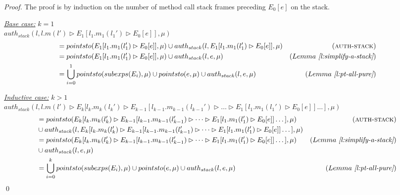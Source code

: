 \documentclass{llncs}
\begin{document}
\begin{proof} The proof is by induction on the number of method call stack frames preceding $E_0[e]$ on the stack.

\noindent\underline{\textit{Base case:}} $k = 1$\\
\noindent$auth_{stack}(l, l.m(l') \rhd E_1[l_1.m_1(l_1') \rhd E_0[e]], \mu)$
\vspace{-7pt}
\begin{align*}
&= pointsto(E_1[l_1.m_1(l_1') \rhd E_0[e]], \mu) \cup auth_{stack}(l, E_1[l_1.m_1(l_1') \rhd E_0[e]], \mu) & (\textsc{auth-stack}) \\
&= pointsto(E_1[l_1.m_1(l_1') \rhd E_0[e]], \mu) \cup auth_{stack}(l, e, \mu) & (Lemma~\textit{\ref{l:simplify-a-stack}}) \\
&= \bigcup^1_{i = 0} pointsto(subexps(E_i), \mu) \cup pointsto(e, \mu) \cup auth_{stack}(l, e, \mu) & (Lemma~\textit{\ref{l:pt-all-pure}})
\end{align*}

\noindent\underline{\textit{Inductive case:}} $k > 1$\\
\noindent$auth_{stack}(l, l.m(l') \rhd E_k[l_k.m_k(l_k') \rhd E_{k-1}[l_{k-1}.m_{k-1}(l_{k-1}') \rhd \dots \rhd E_1[l_1.m_1(l_1') \rhd E_0[e]] \dots ], \mu)$
\vspace{-7pt}
\begin{align*}
&= pointsto(E_k[l_k.m_k(l_k') \rhd E_{k-1}[l_{k-1}.m_{k-1}(l_{k-1}') \rhd \dots \rhd E_1[l_1.m_1(l_1') \rhd E_0[e]] \dots ], \mu) & (\textsc{auth-stack})\\
& \cup auth_{stack}(l, E_k[l_k.m_k(l_k') \rhd E_{k-1}[l_{k-1}.m_{k-1}(l_{k-1}') \rhd \dots \rhd E_1[l_1.m_1(l_1') \rhd E_0[e]] \dots ], \mu)\\
&= pointsto(E_k[l_k.m_k(l_k') \rhd E_{k-1}[l_{k-1}.m_{k-1}(l_{k-1}') \rhd \dots \rhd E_1[l_1.m_1(l_1') \rhd E_0[e]] \dots ], \mu) & (Lemma~\textit{\ref{l:simplify-a-stack}})\\
&\cup auth_{stack}(l, e, \mu) \\
&= \bigcup^k_{i = 0} pointsto(subexps(E_i), \mu) \cup pointsto(e, \mu) \cup auth_{stack}(l, e, \mu) & (Lemma~\textit{\ref{l:pt-all-pure}})
\end{align*}
\qed
\end{proof}
\end{document}
